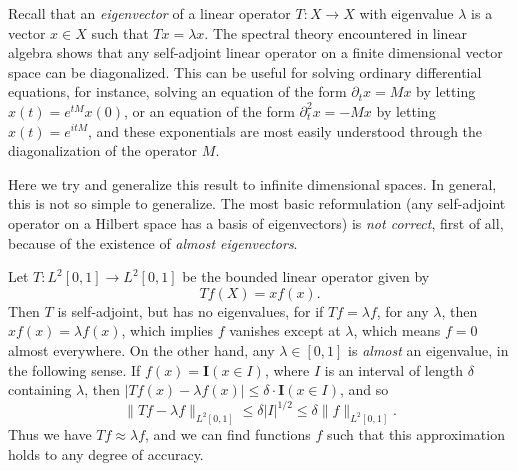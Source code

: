 
Recall that an \emph{eigenvector} of a linear operator $T: X \to X$ with eigenvalue $\lambda$ is a vector $x \in X$ such that $Tx = \lambda x$. The spectral theory encountered in linear algebra shows that any self-adjoint linear operator on a finite dimensional vector space can be diagonalized. This can be useful for solving ordinary differential equations, for instance, solving an equation of the form $\partial_t x = Mx$ by letting $x(t) = e^{tM} x(0)$, or an equation of the form $\partial_t^2 x = -Mx$ by letting $x(t) = e^{itM}$, and these exponentials are most easily understood through the diagonalization of the operator $M$.

Here we try and generalize this result to infinite dimensional spaces. In general, this is not so simple to generalize. The most basic reformulation (any self-adjoint operator on a Hilbert space has a basis of eigenvectors) is \emph{not correct}, first of all, because of the existence of \emph{almost eigenvectors}.

\begin{example}
    Let $T: L^2[0,1] \to L^2[0,1]$ be the bounded linear operator given by
    \[ Tf(X) = x f(x). \]
    Then $T$ is self-adjoint, but has no eigenvalues, for if $Tf = \lambda f$, for any $\lambda$, then $x f(x) = \lambda f(x)$, which implies $f$ vanishes except at $\lambda$, which means $f = 0$ almost everywhere. On the other hand, any $\lambda \in [0,1]$ is \emph{almost} an eigenvalue, in the following sense. If $f(x) = \mathbf{I}(x \in I)$, where $I$ is an interval of length $\delta$ containing $\lambda$, then $|Tf(x) - \lambda f(x)| \leq \delta \cdot \mathbf{I}(x \in I)$, and so
    \[ \| Tf - \lambda f \|_{L^2[0,1]} \leq \delta |I|^{1/2} \leq \delta \| f \|_{L^2[0,1]}. \]
    Thus we have $Tf \approx \lambda f$, and we can find functions $f$ such that this approximation holds to any degree of accuracy.
\end{example}

